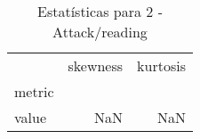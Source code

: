 \begin{table}[htbp]
\caption{Estatísticas para 2 - Attack/reading}
\label{tab:2_-_attack_reading_skewkurt}
\begin{tabular}{lrr}
\toprule
 & skewness & kurtosis \\
metric &  &  \\
\midrule
value & NaN & NaN \\
\bottomrule
\end{tabular}
\end{table}
